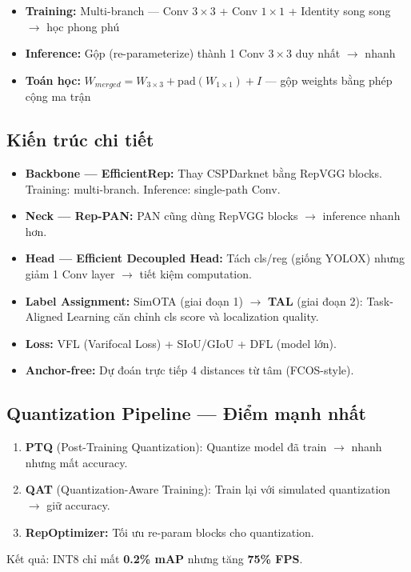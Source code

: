 \begin{itemize}
    \item \textbf{Training:} Multi-branch --- Conv $3\times3$ + Conv $1\times1$ + Identity song song $\rightarrow$ học phong phú
    \item \textbf{Inference:} Gộp (re-parameterize) thành 1 Conv $3\times3$ duy nhất $\rightarrow$ nhanh
    \item \textbf{Toán học:} $W_{merged} = W_{3\times3} + \text{pad}(W_{1\times1}) + I$ --- gộp weights bằng phép cộng ma trận
\end{itemize}

\subsection{Kiến trúc chi tiết}
\begin{itemize}
    \item \textbf{Backbone --- EfficientRep:} Thay CSPDarknet bằng RepVGG blocks. Training: multi-branch. Inference: single-path Conv.
    \item \textbf{Neck --- Rep-PAN:} PAN cũng dùng RepVGG blocks $\rightarrow$ inference nhanh hơn.
    \item \textbf{Head --- Efficient Decoupled Head:} Tách cls/reg (giống YOLOX) nhưng giảm 1 Conv layer $\rightarrow$ tiết kiệm computation.
    \item \textbf{Label Assignment:} SimOTA (giai đoạn 1) $\rightarrow$ \textbf{TAL} (giai đoạn 2): Task-Aligned Learning căn chỉnh cls score và localization quality.
    \item \textbf{Loss:} VFL (Varifocal Loss) + SIoU/GIoU + DFL (model lớn).
    \item \textbf{Anchor-free:} Dự đoán trực tiếp 4 distances từ tâm (FCOS-style).
\end{itemize}

\subsection{Quantization Pipeline --- Điểm mạnh nhất}
\begin{enumerate}
    \item \textbf{PTQ} (Post-Training Quantization): Quantize model đã train $\rightarrow$ nhanh nhưng mất accuracy.
    \item \textbf{QAT} (Quantization-Aware Training): Train lại với simulated quantization $\rightarrow$ giữ accuracy.
    \item \textbf{RepOptimizer:} Tối ưu re-param blocks cho quantization.
\end{enumerate}
Kết quả: INT8 chỉ mất \textbf{0.2\% mAP} nhưng tăng \textbf{75\% FPS}.

